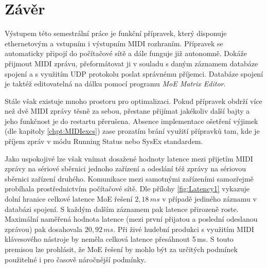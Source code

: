 \chapter*{Závěr}
{}

Výstupem této semestrální práce je funkční přípravek, který disponuje ethernetovým a vstupním i výstupním \acs{MIDI} rozhraním. Přípravek se automaticky připojí do počítačové sítě a dále funguje již autonomně. Dokáže přijmout \acs{MIDI} zprávu, přeformátovat ji v souladu s daným záznamem databáze spojení a s využitím \acs{UDP} protokolu poslat správnému příjemci. Databáze spojení je taktéž editovatelná na dálku pomocí programu \emph{MoE Matrix Editor}. 

Stále však existuje mnoho prostoru pro optimalizaci. Pokud přípravek obdrží více než dvě \acs{MIDI} zprávy těsně za sebou, přestane přijímat jakékoliv další bajty a jeho funkčnost je do restartu přerušena. Absence implementace ošetření výjimek (dle kapitoly \ref{chpt:MIDIexcs}) zase prozatím brání využití přípravků tam, kde je příjem zpráv v módu Running Status nebo SysEx standardem.

Jako uspokojivé lze však vnímat dosažené hodnoty latence mezi přijetím \acs{MIDI} zprávy na sériové sběrnici jednoho zařízení a odeslání též zprávy na sériovou sběrnici zařízení druhého. Komunikace mezi samotnými zařízeními samozřejmě probíhala prostřednictvím počítačové sítě. Dle přílohy \ref{fig:Latency1} vykazuje dolní hranice celkové latence \acs{MoE} řešení $2{,}18\,\unit{ms}$ v případě jediného záznamu v databázi spojení. S každým dalším záznamem pak latence přirozeně roste. Maximální naměřená hodnota latence (mezi první přijatou a poslední odeslanou zprávou) pak dosahovala $20{,}92\,\unit{ms}$. Při živé hudební produkci s využitím \acs{MIDI} klávesového nástroje by neměla celková latence přesáhnout 5\,ms. S touto premisou lze prohlásit, že \acs{MoE} řešení by mohlo být za určitých podmínek použitelné i pro časově náročnější podmínky.